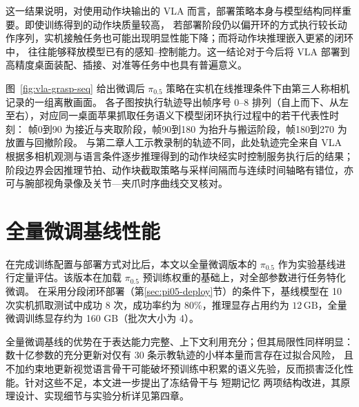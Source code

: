 这一结果说明，对使用动作块输出的 VLA 而言，部署策略本身与模型结构同样重要。即使训练得到的动作块质量较高，
若部署阶段仍以偏开环的方式执行较长动作序列，实机接触任务也可能出现明显性能下降；而将动作块推理嵌入更紧的闭环中，
往往能够释放模型已有的感知--控制能力。这一结论对于今后将 VLA 部署到高精度桌面装配、插接、对准等任务中也具有普遍意义。

图~\ref{fig:vla-grasp-seq} 给出微调后 $\pi_{0.5}$ 策略在实机在线推理条件下由第三人称相机记录的一组离散画面。
各子图按执行轨迹导出帧序号 $0$--$8$ 排列（自上而下、从左至右），对应同一桌面苹果抓取任务语义下模型闭环执行过程中的若干代表性时刻：
帧0到90 为接近与夹取阶段，帧90到180 为抬升与搬运阶段，帧180到270 为放置与回撤阶段。
与第二章人工示教录制的轨迹不同，此处轨迹完全来自 VLA 根据多相机观测与语言条件逐步推理得到的动作块经实时控制服务执行后的结果；
阶段边界会因推理节拍、动作块截取策略与采样间隔而与连续时间轴略有错位，亦可与腕部视角录像及关节—夹爪时序曲线交叉核对。


\section{全量微调基线性能}
\label{sec:pi05-baseline}

在完成训练配置与部署方式对比后，本文以全量微调版本的 $\pi_{0.5}$ 作为实验基线进行定量评估。该版本在加载 $\pi_{0.5}$ 预训练权重的基础上，对全部参数进行任务特化微调。
在采用分段闭环部署（第\ref{sec:pi05-deploy}节）的条件下，基线模型在 10 次实机抓取测试中成功 8 次，成功率约为 $80\%$，推理显存占用约为 $12\,\mathrm{GB}$，全量微调训练显存约为 160 GB（批次大小为 4）。

全量微调基线的优势在于表达能力完整、上下文利用充分；但其局限性同样明显：数十亿参数的充分更新对仅有 30 条示教轨迹的小样本量而言存在过拟合风险，
且不加约束地更新视觉语言骨干可能破坏预训练中积累的语义先验，反而损害泛化性能。针对这些不足，本文进一步提出了冻结骨干与 短期记忆 两项结构改进，其原理设计、实现细节与实验分析详见第四章。


